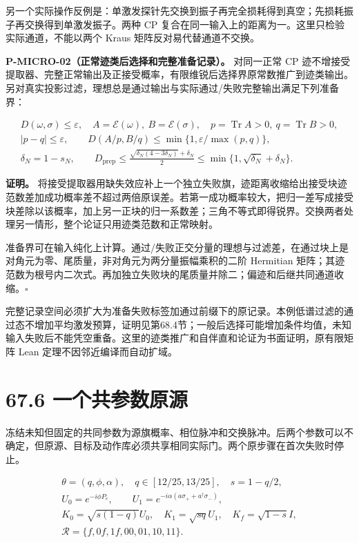 \documentclass[
  11pt,
  oneside]{book}
\begin{document}
另一个实际操作反例是：单激发探针先交换到振子再完全损耗得到真空；先损耗振子再交换得到单激发振子。两种
CP 复合在同一输入上的距离为一。这里只检验实际通道，不能以两个 Kraus
矩阵反对易代替通道不交换。

\protect\hypertarget{p-micro-02}{}{}

\textbf{P-MICRO-02（正常迹类后选择和完整准备记录）。} 对同一正常 CP
迹不增接受提取器、完整正常输出及正接受概率，有限维锐后选择界原常数推广到迹类输出。另对真实投影过滤，理想总是通过输出与实际通过/失败完整输出满足下列准备界：

\[
\begin{gathered}
D(\omega,\sigma)\le\varepsilon,\quad
A=\mathcal E(\omega),\ B=\mathcal E(\sigma),\quad
p=\operatorname{Tr}A>0,\ q=\operatorname{Tr}B>0,\\
|p-q|\le\varepsilon,\qquad
D(A/p,B/q)\le\min\{1,\varepsilon/\max(p,q)\},\\
\delta_N=1-s_N,\qquad
D_{\mathrm{prep}}\le
\frac{\sqrt{\delta_N(4-3\delta_N)}+\delta_N}{2}
\le\min\{1,\sqrt{\delta_N}+\delta_N\}.
\end{gathered}
\]

\textbf{证明。}
将接受提取器用缺失效应补上一个独立失败旗，迹距离收缩给出接受块迹范数差加成功概率差不超过两倍原误差。若第一成功概率较大，把归一差写成接受块差除以该概率，加上另一正块的归一系数差；三角不等式即得锐界。交换两者处理另一情形，整个论证只用迹类范数和正常映射。

准备界可在输入纯化上计算。通过/失败正交分量的理想与过滤差，在通过块上是对角元为零、尾质量，非对角元为两分量振幅乘积的二阶
Hermitian
矩阵；其迹范数为根号内二次式。再加独立失败块的尾质量并除二；偏迹和后继共同通道收缩。\(\square\)

完整记录空间必须扩大为准备失败标签加通过前缀下的原记录。本例低谱过滤的通过态不增加平均激发预算，证明见第68.4节；一般后选择可能增加条件均值，未知输入失败后不能凭空重备。这里的迹类推广和自伴直和论证为书面证明，原有限矩阵
Lean 定理不因邻近编译而自动扩域。

\section{67.6 一个共参数原源}

冻结未知但固定的共同参数为源旗概率、相位脉冲和交换脉冲。后两个参数可以不确定，但原源、目标及动作库必须共享相同实际门。两个原步骤在首次失败时停止。

\[
\begin{gathered}
\theta=(q,\phi,\alpha),\quad q\in[12/25,13/25],\quad s=1-q/2,\\
U_0=e^{-i\phi P_e},\qquad
U_1=e^{-i\alpha(a\sigma_++a^\dagger\sigma_-)},\\
K_0=\sqrt{s(1-q)}U_0,\quad
K_1=\sqrt{sq}U_1,\quad K_f=\sqrt{1-s}I,\\
\mathcal R=\{f,0f,1f,00,01,10,11\}.
\end{gathered}
\]
\end{document}
